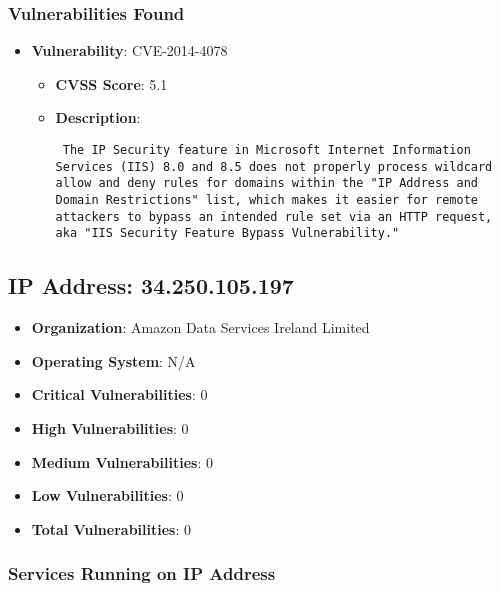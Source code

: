 \documentclass{article}
\begin{document}
\subsubsection*{Vulnerabilities Found}

\begin{itemize}
    
        \item \textbf{Vulnerability}: CVE-2014-4078
        \begin{itemize}
            \item \textbf{CVSS Score}:  5.1 
            \item \textbf{Description}: \parbox{\linewidth}{\texttt{ The IP Security feature in Microsoft Internet Information Services (IIS) 8.0 and 8.5 does not properly process wildcard allow and deny rules for domains within the "IP Address and Domain Restrictions" list, which makes it easier for remote attackers to bypass an intended rule set via an HTTP request, aka "IIS Security Feature Bypass Vulnerability." }}
        \end{itemize}
    
\end{itemize}


\clearpage



\subsection*{IP Address: 34.250.105.197}

\begin{itemize}
    \item \textbf{Organization}: Amazon Data Services Ireland Limited
    \item \textbf{Operating System}:  N/A 
    \item \textbf{Critical Vulnerabilities}: 0
    \item \textbf{High Vulnerabilities}: 0
    \item \textbf{Medium Vulnerabilities}: 0
    \item \textbf{Low Vulnerabilities}: 0
    \item \textbf{Total Vulnerabilities}: 0
\end{itemize}

\subsubsection*{Services Running on IP Address}
\end{document}
